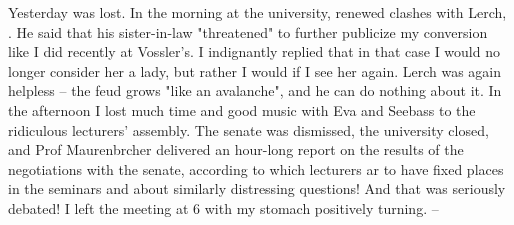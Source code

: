 
Yesterday was lost. In the morning at the university, renewed clashes with Lerch, . He said that his sister-in-law "threatened" to further publicize my conversion  like I did recently at Vossler's. I indignantly replied that in that case I would no longer consider her a lady, but rather I would  if I see her again. Lerch was again helpless -- the feud grows "like an avalanche", and he can do nothing about it. In the afternoon I lost much time and good music with Eva and Seebass to the ridiculous  lecturers' assembly. The senate was dismissed, the university closed, and Prof Maurenbrcher delivered an hour-long report on the results of the negotiations with the senate, according to which lecturers ar to have fixed places in the seminars and about similarly distressing questions! And that was seriously debated! I left the meeting at 6 with my stomach positively turning. -- \missing



